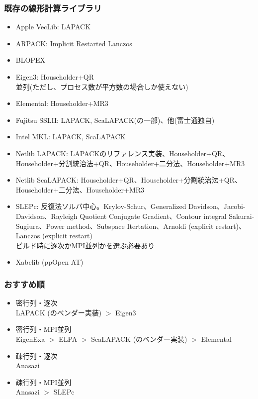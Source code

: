 \begin{frame}
  \frametitle{既存の線形計算ライブラリ}
  \begin{itemize}
  \item Apple VecLib: LAPACK
  \item ARPACK: Implicit Restarted Lanczos
  \item BLOPEX
  \item Eigen3: Householder+QR \\
    並列(ただし、プロセス数が平方数の場合しか使えない)
  \item Elemental: Householder+MR3
  \item Fujitsu SSLII: LAPACK, ScaLAPACK(の一部)、他(富士通独自)
  \item Intel MKL: LAPACK, ScaLAPACK
  \item Netlib LAPACK: LAPACKのリファレンス実装、Householder+QR、Householder+分割統治法+QR、Householder+二分法、Householder+MR3
  \item Netlib ScaLAPACK: Householder+QR、Householder+分割統治法+QR、Householder+二分法、Householder+MR3
  \item SLEPc: 反復法ソルバ中心。Krylov-Schur、Generalized Davidson、Jacobi-Davidson、Rayleigh Quotient Conjugate Gradient、Contour integral Sakurai-Sugiura、Power method、Subspace Itertation、Arnoldi (explicit restart)、Lanczos (explicit restart) \\
    ビルド時に逐次かMPI並列かを選ぶ必要あり
  \item Xabclib (ppOpen AT)
  \end{itemize}
\end{frame}

\begin{frame}
  \frametitle{おすすめ順}
  \begin{itemize}
  \item 密行列・逐次 \\
    LAPACK (のベンダー実装) $>$ Eigen3
  \item 密行列・MPI並列 \\
    EigenExa $>$ ELPA $>$ ScaLAPACK (のベンダー実装) $>$ Elemental
  \item 疎行列・逐次 \\
    Anasazi
  \item 疎行列・MPI並列 \\
    Anasazi $>$ SLEPc
  \end{itemize}
\end{frame}

